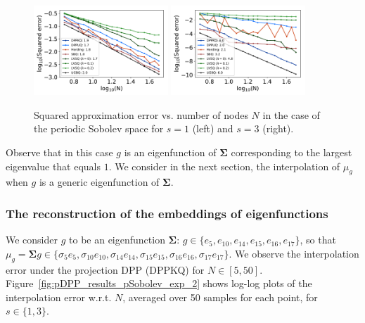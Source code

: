 \documentclass[twoside,11pt]{book}
\numberwithin{theorem}{chapter}
\numberwithin{definition}{chapter}
\numberwithin{proposition}{chapter}
\numberwithin{corollary}{chapter}
\numberwithin{example}{chapter}
\numberwithin{lemma}{chapter}
\begin{document}
\begin{figure}
\centering
\includegraphics[width=0.45\textwidth]{img/neurips/Sobolev/Sobolev_kernel_order_1_fig_1.pdf}
\includegraphics[width=0.45\textwidth]{img/neurips/Sobolev/Sobolev_kernel_order_3_fig_1.pdf}\\
\caption{Squared approximation error vs. number of nodes $N$ in the case of the periodic Sobolev space for $s = 1$ (left) and $s=3$ (right).
\label{fig:pDPP_results_pSobolev_exp_1}}
\end{figure}

Observe that in this case $g$ is an eigenfunction of $\bm{\Sigma}$ corresponding to the largest eigenvalue that equals $1$. We consider in the next section, the interpolation of $\mu_{g}$ when $g$ is a generic eigenfunction of $\bm{\Sigma}$.

\subsubsection{The reconstruction of the embeddings of eigenfunctions}
We consider $g$ to be an eigenfunction $\bm{\Sigma}$: $g \in \{e_{5},e_{10},e_{14},e_{15},e_{16},e_{17}\}$, so that $\mu_{g} = \bm{\Sigma}g \in \{\sigma_{5}e_{5},\sigma_{10}e_{10},\sigma_{14}e_{14},\sigma_{15}e_{15},\sigma_{16}e_{16},\sigma_{17}e_{17}\}$. We observe the interpolation error under the projection DPP (DPPKQ) for $N \in [5,50]$. Figure~\ref{fig:pDPP_results_pSobolev_exp_2} shows log-log plots of the interpolation error  w.r.t. $N$, averaged over 50 samples for each point, for $s \in \{1,3\}$.
\end{document}
